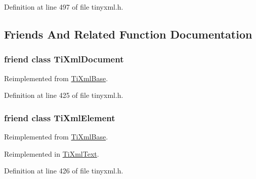 Definition at line 497 of file tinyxml.h.



\subsection{Friends And Related Function Documentation}
\hypertarget{classTiXmlNode_a173617f6dfe902cf484ce5552b950475}{
\subsubsection[{TiXmlDocument}]{\setlength{\rightskip}{0pt plus 5cm}friend class {\bf TiXmlDocument}}}
\label{d3/dd5/classTiXmlNode_a173617f6dfe902cf484ce5552b950475}


Reimplemented from \hyperlink{classTiXmlBase_a173617f6dfe902cf484ce5552b950475}{TiXmlBase}.



Definition at line 425 of file tinyxml.h.

\hypertarget{classTiXmlNode_ab6592e32cb9132be517cc12a70564c4b}{
\subsubsection[{TiXmlElement}]{\setlength{\rightskip}{0pt plus 5cm}friend class {\bf TiXmlElement}}}
\label{d3/dd5/classTiXmlNode_ab6592e32cb9132be517cc12a70564c4b}


Reimplemented from \hyperlink{classTiXmlBase_ab6592e32cb9132be517cc12a70564c4b}{TiXmlBase}.



Reimplemented in \hyperlink{classTiXmlText_ab6592e32cb9132be517cc12a70564c4b}{TiXmlText}.



Definition at line 426 of file tinyxml.h.



